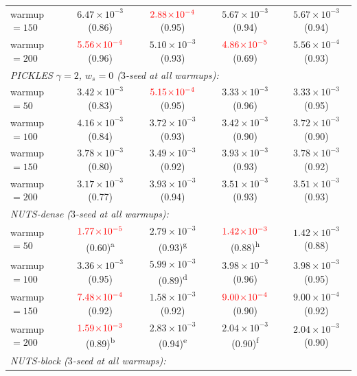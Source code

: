 \documentclass{article}
\begin{document}
\begin{table}[h]
\begin{tabular}{l c c c c}
\quad warmup $=150$ & $6.47\!\times\!10^{-3}$ (0.86) & $\textcolor{red}{2.88\!\times\!10^{-4}}$ (0.95) & $5.67\!\times\!10^{-3}$ (0.94) & $5.67\!\times\!10^{-3}$ (0.94) \\
\quad warmup $=200$ & $\textcolor{red}{5.56\!\times\!10^{-4}}$ (0.96) & $5.10\!\times\!10^{-3}$ (0.93) & $\textcolor{red}{4.86\!\times\!10^{-5}}$ (0.69) & $5.56\!\times\!10^{-4}$ (0.93) \\
\midrule
\multicolumn{5}{l}{\emph{PICKLES $\gamma=2$, $w_s=0$ ($3$-seed at all warmups):}} \\
\quad warmup $=50$  & $3.42\!\times\!10^{-3}$ (0.83) & $\textcolor{red}{5.15\!\times\!10^{-4}}$ (0.95) & $3.33\!\times\!10^{-3}$ (0.96) & $3.33\!\times\!10^{-3}$ (0.95) \\
\quad warmup $=100$ & $4.16\!\times\!10^{-3}$ (0.84) & $3.72\!\times\!10^{-3}$ (0.93) & $3.42\!\times\!10^{-3}$ (0.90) & $3.72\!\times\!10^{-3}$ (0.90) \\
\quad warmup $=150$ & $3.78\!\times\!10^{-3}$ (0.80) & $3.49\!\times\!10^{-3}$ (0.92) & $3.93\!\times\!10^{-3}$ (0.93) & $3.78\!\times\!10^{-3}$ (0.92) \\
\quad warmup $=200$ & $3.17\!\times\!10^{-3}$ (0.77) & $3.93\!\times\!10^{-3}$ (0.94) & $3.51\!\times\!10^{-3}$ (0.93) & $3.51\!\times\!10^{-3}$ (0.93) \\
\midrule
\multicolumn{5}{l}{\emph{NUTS-dense ($3$-seed at all warmups):}} \\
\quad warmup $=50$  & $\textcolor{red}{1.77\!\times\!10^{-5}}$ (0.60)\textsuperscript{a} & $2.79\!\times\!10^{-3}$ (0.93)\textsuperscript{g} & $\textcolor{red}{1.42\!\times\!10^{-3}}$ (0.88)\textsuperscript{h} & $1.42\!\times\!10^{-3}$ (0.88) \\
\quad warmup $=100$ & $3.36\!\times\!10^{-3}$ (0.95) & $5.99\!\times\!10^{-3}$ (0.89)\textsuperscript{d} & $3.98\!\times\!10^{-3}$ (0.96) & $3.98\!\times\!10^{-3}$ (0.95) \\
\quad warmup $=150$ & $\textcolor{red}{7.48\!\times\!10^{-4}}$ (0.92) & $1.58\!\times\!10^{-3}$ (0.92) & $\textcolor{red}{9.00\!\times\!10^{-4}}$ (0.90) & $9.00\!\times\!10^{-4}$ (0.92) \\
\quad warmup $=200$ & $\textcolor{red}{1.59\!\times\!10^{-3}}$ (0.89)\textsuperscript{b} & $2.83\!\times\!10^{-3}$ (0.94)\textsuperscript{e} & $2.04\!\times\!10^{-3}$ (0.90)\textsuperscript{f} & $2.04\!\times\!10^{-3}$ (0.90) \\
\midrule
\multicolumn{5}{l}{\emph{NUTS-block ($3$-seed at all warmups):}} \\

\end{tabular}
\end{table}
\end{document}
